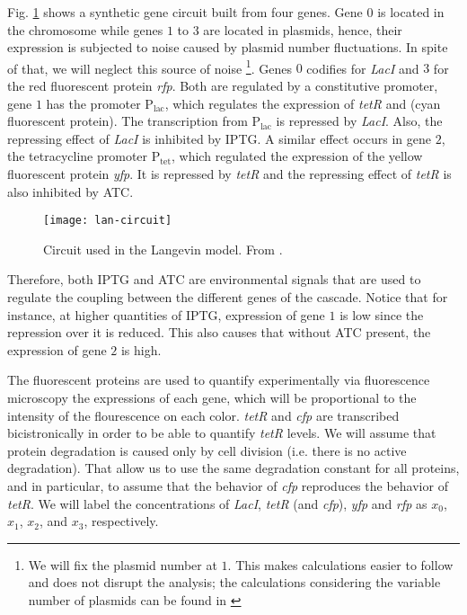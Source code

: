 Fig. \ref{fig:lan-circuit} shows a synthetic gene circuit built from four genes. Gene $0$ is located in the chromosome while genes $1$ to $3$ are located in plasmids, hence, their expression is subjected to noise caused by plasmid number fluctuations. In spite of that, we will neglect this source of noise \footnote{We will fix the plasmid number at $1$. This makes calculations easier to follow and does not disrupt the analysis; the calculations considering the variable number of plasmids can be found in \cite{pedraza05}}. Genes $0$ codifies for \textit{LacI} and $3$ for the red fluorescent protein \textit{rfp}. Both are regulated by a constitutive promoter, gene $1$ has the promoter P$_\text{lac}$, which regulates the expression of \textit{tetR} and  (cyan fluorescent protein). The transcription from P$_\text{lac}$ is repressed by \textit{LacI}. Also, the repressing effect of \textit{LacI} is inhibited by IPTG. A similar effect occurs in gene $2$, the tetracycline promoter P$_\text{tet}$, which regulated the expression of the yellow fluorescent protein \textit{yfp}. It is repressed by \textit{tetR} and the repressing effect of \textit{tetR} is also inhibited by ATC.
\begin{figure}[H]
  \centering
  \texttt{[image: lan-circuit]}
  \caption[Circuit used for the Langevin model]{\label{fig:lan-circuit} Circuit used in the Langevin model. From \cite{pedraza05}.}
\end{figure}

Therefore, both IPTG and ATC are environmental signals that are used to regulate the coupling between the different genes of the cascade. Notice that for instance, at higher quantities of IPTG, expression of gene $1$ is low since the repression over it is reduced. This also causes that without ATC present, the expression of gene $2$ is high. 

The fluorescent proteins are used to quantify experimentally via fluorescence microscopy the expressions of each gene, which will be proportional to the intensity of the flourescence on each color. \textit{tetR} and \textit{cfp} are transcribed bicistronically in order to be able to quantify \textit{tetR} levels. We will assume that protein degradation is caused only by cell division (i.e. there is no active degradation). That allow us to use the same degradation constant for all proteins, and in particular, to assume that the behavior of \textit{cfp} reproduces the behavior of \textit{tetR}. We will label the concentrations of \textit{LacI}, \textit{tetR} (and \textit{cfp}), \textit{yfp} and \textit{rfp} as $x_0$, $x_1$, $x_2$, and $x_3$, respectively.

